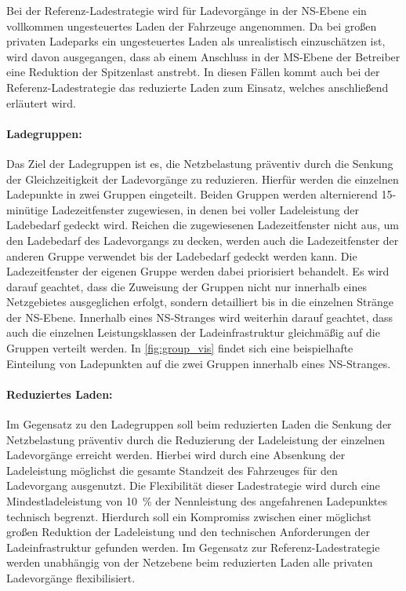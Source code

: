Bei der Referenz-Ladestrategie wird für Ladevorgänge in der \gls{NS}-Ebene ein vollkommen ungesteuertes Laden der Fahrzeuge angenommen.
Da bei großen privaten Ladeparks ein ungesteuertes Laden als unrealistisch einzuschätzen ist, wird davon ausgegangen, dass ab einem Anschluss in der \gls{MS}-Ebene der Betreiber eine Reduktion der Spitzenlast anstrebt.
In diesen Fällen kommt auch bei der Referenz-Ladestrategie das reduzierte Laden zum Einsatz, welches anschließend erläutert wird.


\paragraph{Ladegruppen:}

Das Ziel der Ladegruppen ist es, die Netzbelastung präventiv durch die Senkung der Gleichzeitigkeit der Ladevorgänge zu reduzieren.
Hierfür werden die einzelnen Ladepunkte in zwei Gruppen eingeteilt.
Beiden Gruppen werden alternierend 15-minütige Ladezeitfenster zugewiesen, in denen bei voller Ladeleistung der Ladebedarf gedeckt wird.
Reichen die zugewiesenen Ladezeitfenster nicht aus, um den Ladebedarf des Ladevorgangs zu decken, werden auch die Ladezeitfenster der anderen Gruppe verwendet bis der Ladebedarf gedeckt werden kann.
Die Ladezeitfenster der eigenen Gruppe werden dabei priorisiert behandelt.
Es wird darauf geachtet, dass die Zuweisung der Gruppen nicht nur innerhalb eines Netzgebietes ausgeglichen erfolgt, sondern detailliert bis in die einzelnen Stränge der \gls{NS}-Ebene.
Innerhalb eines \gls{NS}-Stranges wird weiterhin darauf geachtet, dass auch die einzelnen Leistungsklassen der Ladeinfrastruktur gleichmäßig auf die Gruppen verteilt werden.
In \autoref{fig:group_vis} findet sich eine beispielhafte Einteilung von Ladepunkten auf die zwei Gruppen innerhalb eines \gls{NS}-Stranges. \cite{Schachler2021}




\paragraph{Reduziertes Laden:}

Im Gegensatz zu den Ladegruppen soll beim reduzierten Laden die Senkung der Netzbelastung präventiv durch die Reduzierung der Ladeleistung der einzelnen Ladevorgänge erreicht werden.
Hierbei wird durch eine Absenkung der Ladeleistung möglichst die gesamte Standzeit des Fahrzeuges für den Ladevorgang ausgenutzt.
Die Flexibilität dieser Ladestrategie wird durch eine Mindestladeleistung von \SI{10}{\percent} der Nennleistung des angefahrenen Ladepunktes technisch begrenzt.
Hierdurch soll ein Kompromiss zwischen einer möglichst großen Reduktion der Ladeleistung und den technischen Anforderungen der Ladeinfrastruktur gefunden werden.
Im Gegensatz zur Referenz-Ladestrategie werden unabhängig von der Netzebene beim reduzierten Laden alle privaten Ladevorgänge flexibilisiert. \cite{Schachler2021}


